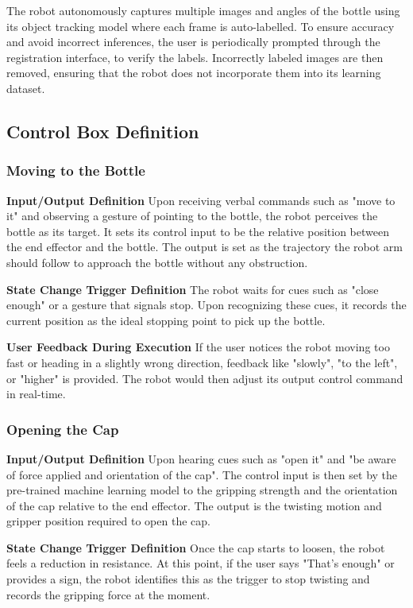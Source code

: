\documentclass[conference]{IEEEtran}
\begin{document}
The robot autonomously captures multiple images and angles of the bottle using its object tracking model where each frame is auto-labelled. To ensure accuracy and avoid incorrect inferences, the user is periodically prompted through the registration interface, to verify the labels. Incorrectly labeled images are then removed, ensuring that the robot does not incorporate them into its learning dataset. 

\subsection{Control Box Definition}

\subsubsection{Moving to the Bottle}
\textbf{Input/Output Definition}
Upon receiving verbal commands such as "move to it" and observing a gesture of pointing to the bottle, the robot perceives the bottle as its target. It sets its control input to be the relative position between the end effector and the bottle. The output is set as the trajectory the robot arm should follow to approach the bottle without any obstruction.

\textbf{State Change Trigger Definition}
The robot waits for cues such as "close enough" or a gesture that signals stop. Upon recognizing these cues, it records the current position as the ideal stopping point to pick up the bottle.

\textbf{User Feedback During Execution}
If the user notices the robot moving too fast or heading in a slightly wrong direction, feedback like "slowly", "to the left", or "higher" is provided. The robot would then adjust its output control command in real-time.

\subsubsection{Opening the Cap}
\textbf{Input/Output Definition}
Upon hearing cues such as "open it" and "be aware of force applied and orientation of the cap". The control input is then set by the pre-trained machine learning model to the gripping strength and the orientation of the cap relative to the end effector. The output is the twisting motion and gripper position required to open the cap.

\textbf{State Change Trigger Definition}
Once the cap starts to loosen, the robot feels a reduction in resistance. At this point, if the user says "That's enough" or provides a sign, the robot identifies this as the trigger to stop twisting and records the gripping force at the moment.
\end{document}
